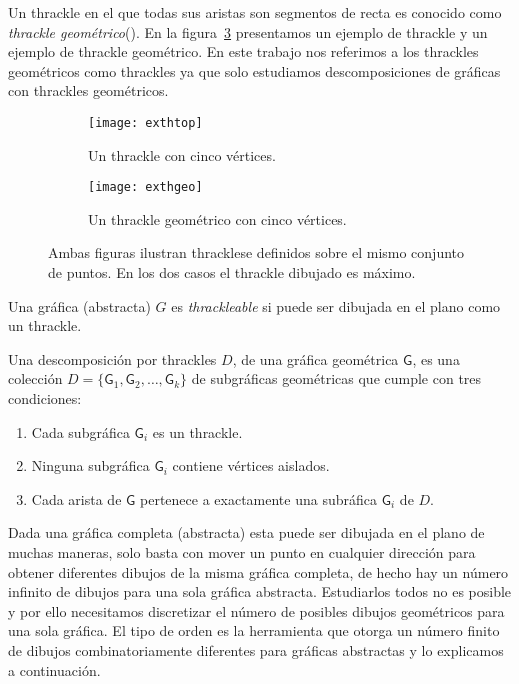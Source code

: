 Un thrackle en el que todas sus aristas son segmentos de recta es conocido como
\emph{thrackle geométrico}(\cite{Schaefer2018}). En la figura~\ref{fig:exthgeotop}
presentamos un ejemplo de thrackle y un ejemplo de thrackle geométrico.
En este trabajo nos referimos a los thrackles geométricos
como thrackles ya que solo estudiamos descomposiciones de gráficas con
thrackles geométricos.

\begin{figure}[htb]
  \centering
\begin{subfigure}[h]{.4\textwidth}
  \centering
  \texttt{[image: exthtop]}
  \caption{Un thrackle con cinco vértices.}
  \label{fig:exthtop}
\end{subfigure}\hfill%
\begin{subfigure}[h]{.4\textwidth}
  \centering
  \texttt{[image: exthgeo]}
  \caption{Un thrackle geométrico con cinco vértices.}
  \label{fig:exthgeo}
\end{subfigure}
\caption{Ambas figuras ilustran thracklese definidos sobre el mismo conjunto de
puntos. En los dos casos el thrackle dibujado es máximo.}
\label{fig:exthgeotop}
\end{figure}

Una gráfica (abstracta) $G$ es \emph{thrackleable} si puede ser dibujada en el plano como un thrackle.

Una descomposición por thrackles $D$, de una gráfica geométrica
$\mathsf{G}$, es una colección $D=\{\mathsf{G}_1,\mathsf{G}_2,\dots,\mathsf{G}_k\}$
de subgráficas geométricas que cumple con tres condiciones:
\begin{enumerate}
  \item Cada subgráfica $\mathsf{G}_i$ es un thrackle.
  \item Ninguna subgráfica $\mathsf{G}_i$ contiene vértices aislados.
  \item Cada arista de $\mathsf{G}$ pertenece a exactamente una subráfica $\mathsf{G}_i$ de $D$.
\end{enumerate}

Dada una gráfica completa (abstracta) esta puede ser dibujada en el plano
de muchas maneras, solo basta con mover un punto en cualquier dirección
para obtener diferentes dibujos de la misma gráfica completa, de hecho
hay un número infinito de dibujos para una sola gráfica abstracta. Estudiarlos
todos no es posible y por ello necesitamos discretizar el número de
posibles dibujos geométricos para una sola gráfica. El tipo de orden es
la herramienta que otorga un número finito de dibujos combinatoriamente diferentes para
gráficas abstractas y lo explicamos a continuación.

